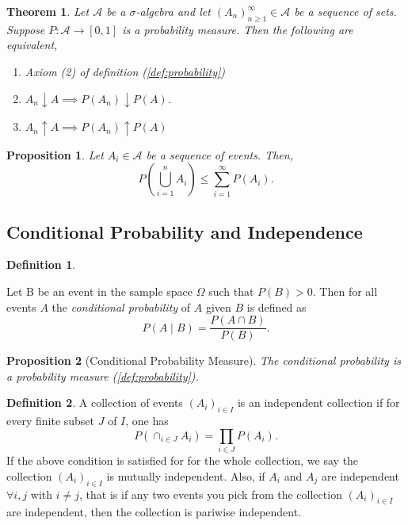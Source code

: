 \documentclass{article}
\newtheorem{theorem}{Theorem}[section]
\newtheorem{proposition}{Proposition}[section]
\theoremstyle{definition}
\newtheorem{definition}{Definition}[section]
\theoremstyle{remark}
\begin{document}
\begin{theorem}\label{thm:convergence of P of seq of sets}
Let $\mathcal{A}$ be a $\sigma$-algebra and let $(A_n)^\infty_{n\geq 1} \in \mathcal{A}$ be a sequence of sets. Suppose $P: \mathcal{A}\to [0,1]$ is a probability measure.
Then the following are equivalent, 
\begin{enumerate}
\item Axiom (2) of definition (\ref{def:probability})
\item $A_n \downarrow A \implies P(A_n) \downarrow P(A)$.
\item $A_n \uparrow A \implies P(A_n) \uparrow P(A)$
\end{enumerate}
\end{theorem}




\begin{proposition}
Let $A_i \in \mathcal{A}$ be a sequence of events. Then, 
\[
P\left(\bigcup_{i=1}^{n} A_i \right) \leq \sum_{i=1}^{\infty} P(A_i).
\]
\end{proposition}





\subsection{Conditional Probability and Independence}


\begin{definition} \label{def: conditional_prob}


Let B be an event in the sample space \(\Omega\) such that \(P(B) > 0\). Then for all events \(A\) the \textit{conditional probability} of \(A\) given \(B\) is defined as
\[
P(A \mid B) = \frac{P(A \cap B)}{P(B)}.
\]

\end{definition}

\begin{proposition}[Conditional Probability Measure]\label{prop:conditional prob is a prob measure}
The conditional probability is a probability measure (\ref{def:probability}).
\end{proposition}





\begin{definition}\label{def: independence}
A collection of events $(A_i)_{i \in I}$ is an independent collection if for every finite subset $J$ of $I$, one has 
\[
P(\cap_{i \in J}{A_i}) = \prod_{i \in J}{P(A_i)}.
\]
If the above condition is satisfied for for the whole collection, we say the collection $(A_i)_{i \in I}$ is mutually independent. Also, 
if $A_i$ and $A_j$ are independent $\forall i,j$ with $i \neq j$, that is if any two events you pick from the collection $(A_i)_{i \in I}$ are independent, then the collection is pariwise independent.

\end{definition}
\end{document}
